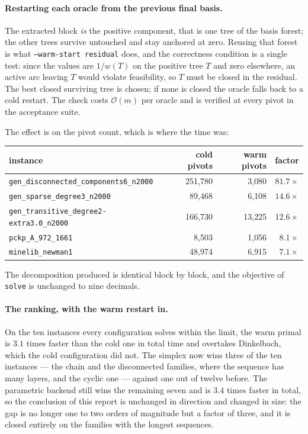 \paragraph{Restarting each oracle from the previous final basis.} The extracted
block \emph{is} the positive component, that is one tree of the basis forest;
the other trees survive untouched and stay anchored at zero. Reusing that forest
is what \texttt{--warm-start residual} does, and the correctness condition is a
single test: since the values are $1/w(T)$ on the positive tree $T$ and zero
elsewhere, an active arc leaving $T$ would violate feasibility, so $T$ must be
closed in the residual. The best closed surviving tree is chosen; if none is
closed the oracle falls back to a cold restart. The check costs $\mathcal{O}(m)$
per oracle and is verified at every pivot in the acceptance suite.

The effect is on the pivot count, which is where the time was:

\begin{center}
\begin{tabular}{@{}lrrr@{}}
\toprule
instance & cold pivots & warm pivots & factor \\
\midrule
\texttt{gen\_disconnected\_components6\_n2000} & 251{,}780 & 3{,}080 & $81.7\times$ \\
\texttt{gen\_sparse\_degree3\_n2000}           &  89{,}468 & 6{,}108 & $14.6\times$ \\
\texttt{gen\_transitive\_degree2-extra3.0\_n2000} & 166{,}730 & 13{,}225 & $12.6\times$ \\
\texttt{pckp\_A\_972\_1661}                    &   8{,}503 & 1{,}056 & $8.1\times$ \\
\texttt{minelib\_newman1}                      &  48{,}974 & 6{,}915 & $7.1\times$ \\
\bottomrule
\end{tabular}
\end{center}

The decomposition produced is identical block by block, and the objective of
\texttt{solve} is unchanged to nine decimals.

\paragraph{The ranking, with the warm restart in.} On the ten instances every
configuration solves within the limit, the warm primal is $3.1$ times faster
than the cold one in total time and overtakes Dinkelbach, which the cold
configuration did not. The simplex now wins three of the ten instances --- the
chain and the disconnected families, where the sequence has many layers, and the
cyclic one --- against one out of twelve before. The parametric backend still
wins the remaining seven and is $3.4$ times faster in total, so the conclusion
of this report is unchanged in direction and changed in size: the gap is no
longer one to two orders of magnitude but a factor of three, and it is closed
entirely on the families with the longest sequences.

